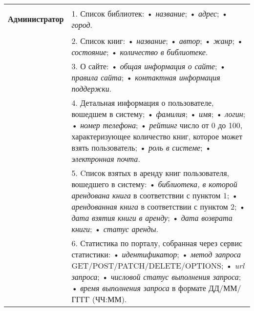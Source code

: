 \begin{longtable}{|p{0.5cm}|p{15.5cm}|}
  \hline
	\begin{rotatebox}[origin=r]{90}
		{\textbf{Администратор}}
	\end{rotatebox} 
	& 
	1. Список библиотек: \newline
    • \textit{название}; \newline
    • \textit{адрес}; \newline
    • \textit{город}. \\
	\cline{2-2}
    &
  2. Список книг: \newline
    • \textit{название}; \newline
    • \textit{автор}; \newline
    • \textit{жанр}; \newline
    • \textit{состояние}; \newline
    • \textit{количество в библиотеке}. \\
	\cline{2-2}
    &
	3. О сайте: \newline
   • \textit{общая информация о сайте}; \newline
   • \textit{правила сайта}; \newline
   • \textit{контактная информация поддержки}. \\
    \cline{2-2}
    &
  4. Детальная информация о пользователе, вошедшем в систему; \newline
    • \textit{фамилия}; \newline
    • \textit{имя}; \newline
    • \textit{логин}; \newline
    • \textit{номер телефона}; \newline
    • \textit{рейтинг} число от 0 до 100, характеризующее количество книг, которое может взять пользователь; \newline
    • \textit{роль в системе}; \newline
    • \textit{электронная почта}.\\
	\cline{2-2}
	&
	5. Cписок взятых в аренду книг пользователя, вошедшего в систему: \newline
    • \textit{библиотека, в которой арендована книга} в соответствии с пунктом 1; \newline
    • \textit{арендованная книга} в соответствии с пунктом 2; \newline
    • \textit{дата взятия книги в аренду}; \newline
    • \textit{дата возврата книги}; \newline
    • \textit{статус аренды}. \\
	\cline{2-2}
  &
  6. Статистика по порталу, собранная через сервис статистики:
    • \textit{идентификатор}; \newline
    • \textit{метод запроса} GET/POST/PATCH/DELETE/OPTIONS; \newline
    • \textit{url запроса}; \newline
    • \textit{числовой статус выполнения запроса}; \newline
    • \textit{время выполнения запроса} в формате ДД/ММ/ГГГГ (ЧЧ:ММ). \\
	\hline
\end{longtable}


